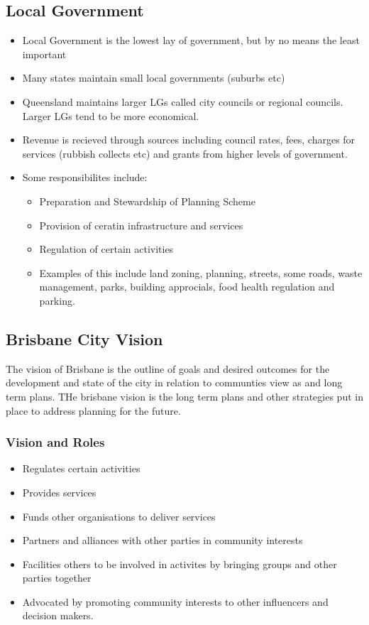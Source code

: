 \documentclass{report}
\begin{document}
	\subsection{Local Government}
	\begin{itemize}
		\item Local Government is the lowest lay of government, but by no means the least important
		\item Many states maintain small local governments (suburbs etc)
		\item Queensland maintains larger LGs called city councils or regional councils. Larger LGs tend to be more economical. 
		\item Revenue is recieved through sources including council rates, fees, charges for services (rubbish collects etc) and grants from higher levels of government. 
		\item Some responsibilites include:
		\begin{itemize}
			\item Preparation and Stewardship of Planning Scheme
			\item Provision of ceratin infrastructure and services
			\item Regulation of certain activities
			\item Examples of this include land zoning, planning, streets, some roads, waste management, parks, building approcials, food health regulation and parking.
		\end{itemize}
	\end{itemize}

	\subsection{Brisbane City Vision}
	The vision of Brisbane is the outline of goals and desired outcomes for the development and state of the city in relation to communties view as and long term plans. THe brisbane vision is the long term plans and other strategies put in place to address planning for the future. 
	
	\subsubsection{Vision and Roles}
	\begin{itemize}
		\item Regulates certain activities
		\item Provides services
		\item Funds other organisations to deliver services
		\item Partners and alliances with other parties in community interests
		\item Facilities others to be involved in activites by bringing groups and other parties together
		\item Advocated by promoting community interests to other influencers and decision makers. 
	\end{itemize}
\end{document}

